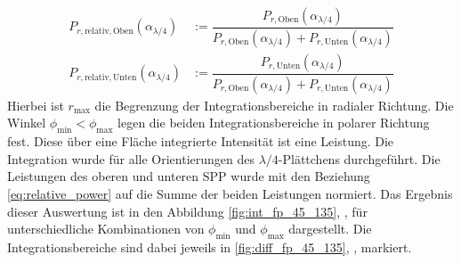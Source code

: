 \documentclass[titlepage,  ngerman]{article}
\begin{document}
		 \begin{align}
		 	\label{eq:relative_power}
		 	P_{r, \mathrm{relativ}, \mathrm{Oben}}(\alpha_{\lambda/4}) &:= 	\dfrac{P_{r, \mathrm{Oben}}(\alpha_{\lambda/4})}{P_{r, \mathrm{Oben}}(\alpha_{\lambda/4}) + P_{r, \mathrm{Unten}}(\alpha_{\lambda/4})} \\
		 	\nonumber
		 	P_{r, \mathrm{relativ}, \mathrm{Unten}}(\alpha_{\lambda/4}) &:= 	\dfrac{P_{r, \mathrm{Unten}}(\alpha_{\lambda/4})}{P_{r, \mathrm{Oben}}(\alpha_{\lambda/4}) + P_{r, \mathrm{Unten}}(\alpha_{\lambda/4})}	 	
		 \end{align}
	 	Hierbei ist $r_\mathrm{max}$ die Begrenzung der Integrationsbereiche in radialer Richtung. Die Winkel $\phi_\mathrm{min} < \phi_\mathrm{max}$ legen die beiden Integrationsbereiche in polarer
	 	 Richtung fest. Diese über eine Fläche integrierte Intensität ist eine Leistung. Die Integration wurde für alle Orientierungen des $\lambda/4$-Plättchens durchgeführt. Die Leistungen des oberen und unteren SPP wurde mit den Beziehung \eqref{eq:relative_power} auf die Summe der beiden Leistungen normiert. Das Ergebnis dieser Auswertung ist in den Abbildung \ref{fig:int_fp_45_135}, ,  für unterschiedliche Kombinationen von $\phi_\mathrm{min}$ und $\phi_\mathrm{max}$ dargestellt. Die Integrationsbereiche sind dabei jeweils in  \ref{fig:diff_fp_45_135}, ,  markiert.		 
\end{document}
